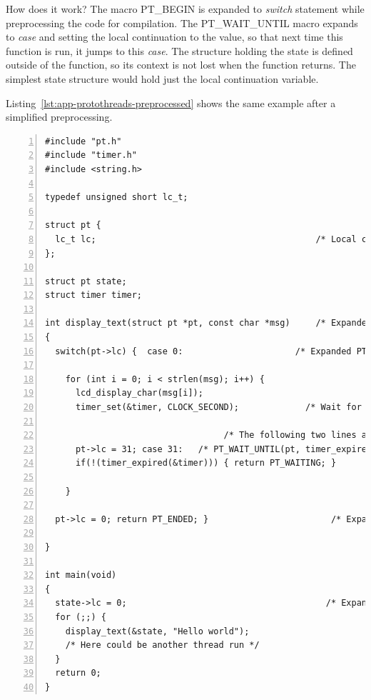 How does it work? The macro PT\_BEGIN is expanded to {\it switch} statement while preprocessing the
code for compilation.
The PT\_WAIT\_UNTIL macro expands to {\it case} and setting the local continuation
to the value, so that next time this function is run, it jumps to this {\it case}.
The structure holding the state is defined outside of the function, so its context is not lost when
the function returns. The simplest state structure would hold just the local continuation variable.

Listing~\ref{lst:app-protothreads-preprocessed} shows
the same example after a simplified preprocessing.
\begin{lstlisting}[numbers=left,caption={Preprocessed example using Protothreads},label=lst:app-protothreads-preprocessed]
#include "pt.h"
#include "timer.h"
#include <string.h>

typedef unsigned short lc_t;

struct pt {
  lc_t lc;                                           /* Local continuation */
};

struct pt state;
struct timer timer;

int display_text(struct pt *pt, const char *msg)     /* Expanded PT_THREAD */
{
  switch(pt->lc) {  case 0:                      /* Expanded PT_BEGIN(pt); */

    for (int i = 0; i < strlen(msg); i++) {
      lcd_display_char(msg[i]);
      timer_set(&timer, CLOCK_SECOND);             /* Wait for one second. */

                                   /* The following two lines are expanded */
      pt->lc = 31; case 31:   /* PT_WAIT_UNTIL(pt, timer_expired(&timer)); */
      if(!(timer_expired(&timer))) { return PT_WAITING; }         /* macro */

    }

  pt->lc = 0; return PT_ENDED; }                        /* Expanded PT_END */

}

int main(void)
{
  state->lc = 0;                                       /* Expanded PT_INIT */
  for (;;) {
    display_text(&state, "Hello world");
    /* Here could be another thread run */
  }
  return 0;
}
\end{lstlisting}


